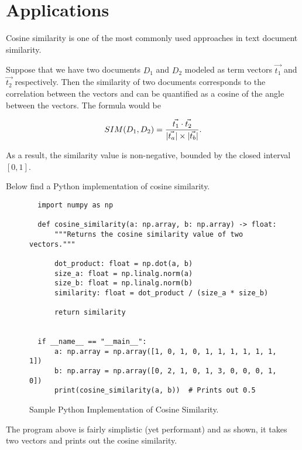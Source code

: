 \documentclass[11pt]{article}
\DeclarePairedDelimiter\abs{\lvert}{\rvert}               %
\begin{document}
\section{Applications}

Cosine similarity is one of the most commonly used approaches in text document
similarity.

\bigskip

Suppose that we have two documents \(D_1\) and \(D_2\) modeled as term vectors
\(\vec{t_1}\) and \(\vec{t_2}\) respectively. Then the similarity of two
documents corresponds to the correlation between the vectors and can be
quantified as a cosine of the angle between the vectors. The formula would be

\[SIM(D_1, D_2) = \dfrac{\vec{t_1} \cdot \vec{t_2}}{\abs{\vec{t_a}} \times
  \abs{\vec{t_b}}}.\]

As a result, the similarity value is non-negative, bounded by the closed
interval \([0,1]\).

\bigskip

Below find a Python implementation of cosine similarity.

\begin{figure}[h]
  \begin{verbatim}
  import numpy as np

  def cosine_similarity(a: np.array, b: np.array) -> float:
      """Returns the cosine similarity value of two vectors."""

      dot_product: float = np.dot(a, b)
      size_a: float = np.linalg.norm(a)
      size_b: float = np.linalg.norm(b)
      similarity: float = dot_product / (size_a * size_b)

      return similarity


  if __name__ == "__main__":
      a: np.array = np.array([1, 0, 1, 0, 1, 1, 1, 1, 1, 1, 1])
      b: np.array = np.array([0, 2, 1, 0, 1, 3, 0, 0, 0, 1, 0])
      print(cosine_similarity(a, b))  # Prints out 0.5
  \end{verbatim}
  \caption{Sample Python Implementation of Cosine Similarity.}
\end{figure}

The program above is fairly simplistic (yet performant) and as shown, it takes
two vectors and prints out the cosine similarity.

\end{document}
